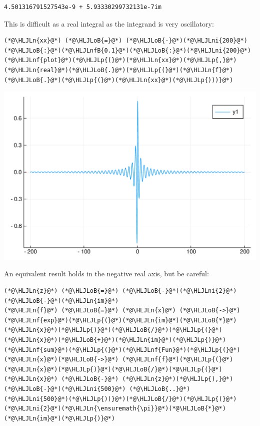 \documentclass[12pt,a4paper]{article}
\newcommand{\HLJLn}[1]{#1}
\newcommand{\HLJLnf}[1]{\textcolor[RGB]{66,102,213}{#1}}
\newcommand{\HLJLnfB}[1]{\textcolor[RGB]{59,151,46}{#1}}
\newcommand{\HLJLni}[1]{\textcolor[RGB]{59,151,46}{#1}}
\newcommand{\HLJLoB}[1]{\textcolor[RGB]{102,102,102}{\textbf{#1}}}
\newcommand{\HLJLp}[1]{#1}
\begin{document}
\begin{lstlisting}
4.501316791527543e-9 + 5.93330299732131e-7im
\end{lstlisting}


This is difficult as a real integral as the integrand is very oscillatory:


\begin{lstlisting}
(*@\HLJLn{xx}@*) (*@\HLJLoB{=}@*) (*@\HLJLoB{-}@*)(*@\HLJLni{200}@*)(*@\HLJLoB{:}@*)(*@\HLJLnfB{0.1}@*)(*@\HLJLoB{:}@*)(*@\HLJLni{200}@*)
(*@\HLJLnf{plot}@*)(*@\HLJLp{(}@*)(*@\HLJLn{xx}@*)(*@\HLJLp{,}@*)(*@\HLJLn{real}@*)(*@\HLJLoB{.}@*)(*@\HLJLp{(}@*)(*@\HLJLn{f}@*)(*@\HLJLoB{.}@*)(*@\HLJLp{(}@*)(*@\HLJLn{xx}@*)(*@\HLJLp{)))}@*)
\end{lstlisting}

\includegraphics[width=\linewidth]{figures/Lecture5_9_1.pdf}

An equivalent result holds in the negative real axis, but be careful:


\begin{lstlisting}
(*@\HLJLn{z}@*) (*@\HLJLoB{=}@*) (*@\HLJLoB{-}@*)(*@\HLJLni{2}@*)(*@\HLJLoB{-}@*)(*@\HLJLn{im}@*)
(*@\HLJLn{f}@*) (*@\HLJLoB{=}@*) (*@\HLJLn{x}@*) (*@\HLJLoB{->}@*) (*@\HLJLnf{exp}@*)(*@\HLJLp{(}@*)(*@\HLJLn{im}@*)(*@\HLJLoB{*}@*)(*@\HLJLn{x}@*)(*@\HLJLp{)}@*)(*@\HLJLoB{/}@*)(*@\HLJLp{(}@*)(*@\HLJLn{x}@*)(*@\HLJLoB{+}@*)(*@\HLJLn{im}@*)(*@\HLJLp{)}@*)
(*@\HLJLnf{sum}@*)(*@\HLJLp{(}@*)(*@\HLJLnf{Fun}@*)(*@\HLJLp{(}@*)(*@\HLJLn{x}@*)(*@\HLJLoB{->}@*) (*@\HLJLnf{f}@*)(*@\HLJLp{(}@*)(*@\HLJLn{x}@*)(*@\HLJLp{)}@*)(*@\HLJLoB{/}@*)(*@\HLJLp{(}@*)(*@\HLJLn{x}@*) (*@\HLJLoB{-}@*) (*@\HLJLn{z}@*)(*@\HLJLp{),}@*) (*@\HLJLoB{-}@*)(*@\HLJLni{500}@*) (*@\HLJLoB{..}@*) (*@\HLJLni{500}@*)(*@\HLJLp{))}@*)(*@\HLJLoB{/}@*)(*@\HLJLp{(}@*)(*@\HLJLni{2}@*)(*@\HLJLn{\ensuremath{\pi}}@*)(*@\HLJLoB{*}@*)(*@\HLJLn{im}@*)(*@\HLJLp{)}@*)
\end{lstlisting}
\end{document}
